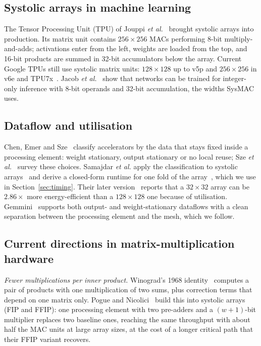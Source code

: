 \documentclass[conference]{IEEEtran}
\begin{document}
\subsection{Systolic arrays in machine learning}
The Tensor Processing Unit (TPU) of Jouppi \emph{et al.}~\cite{jouppi2017} brought systolic arrays into production. Its matrix unit contains $256 \times 256$ MACs performing 8-bit multiply-and-adds; activations enter from the left, weights are loaded from the top, and 16-bit products are summed in 32-bit accumulators below the array. Current Google TPUs still use systolic matrix units: $128 \times 128$ up to v5p and $256 \times 256$ in v6e and TPU7x~\cite{tpudocs}. Jacob \emph{et al.}~\cite{jacob2018} show that networks can be trained for integer-only inference with 8-bit operands and 32-bit accumulation, the widths SysMAC uses.

\subsection{Dataflow and utilisation}
Chen, Emer and Sze~\cite{eyeriss2016} classify accelerators by the data that stays fixed inside a processing element: weight stationary, output stationary or no local reuse; Sze \emph{et al.}~\cite{sze2017} survey these choices. Samajdar \emph{et al.} apply the classification to systolic arrays~\cite{scalesim2018} and derive a closed-form runtime for one fold of the array~\cite{scalesim2020}, which we use in Section~\ref{sec:timing}. Their later version~\cite{scalesim3} reports that a $32 \times 32$ array can be $2.86\times$ more energy-efficient than a $128 \times 128$ one because of utilisation. Gemmini~\cite{gemmini2021} supports both output- and weight-stationary dataflows with a clean separation between the processing element and the mesh, which we follow.

\subsection{Current directions in matrix-multiplication hardware}
\emph{Fewer multiplications per inner product.} Winograd's 1968 identity~\cite{winograd1968} computes a pair of products with one multiplication of two sums, plus correction terms that depend on one matrix only. Pogue and Nicolici~\cite{pogue2024} build this into systolic arrays (FIP and FFIP): one processing element with two pre-adders and a $(w{+}1)$-bit multiplier replaces two baseline ones, reaching the same throughput with about half the MAC units at large array sizes, at the cost of a longer critical path that their FFIP variant recovers.
\end{document}
